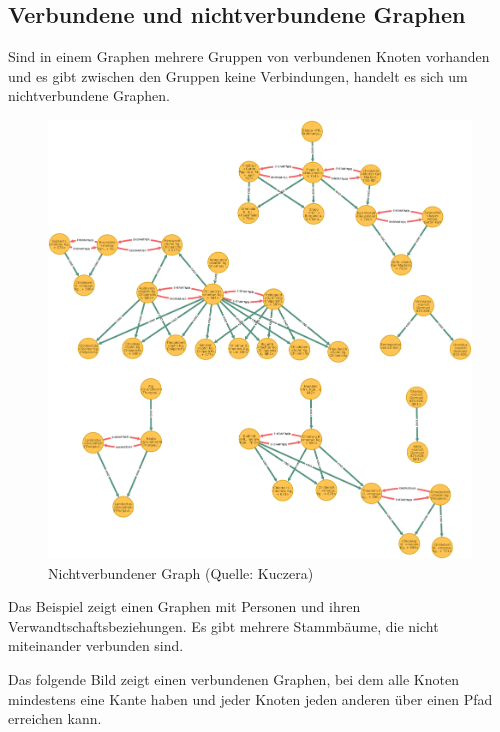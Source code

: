 \documentclass[ngerman,]{scrreprt}
\begin{document}
\hypertarget{verbundene-und-nichtverbundene-graphen}{%
\subsection{Verbundene und nichtverbundene Graphen}\label{verbundene-und-nichtverbundene-graphen}}

Sind in einem Graphen mehrere Gruppen von verbundenen Knoten vorhanden und es gibt zwischen den Gruppen keine Verbindungen, handelt es sich um nichtverbundene Graphen.

\begin{figure}
\centering
\includegraphics{Bilder/disconnectedGraph.png}
\caption{Nichtverbundener Graph (Quelle: Kuczera)}
\end{figure}

Das Beispiel zeigt einen Graphen mit Personen und ihren Verwandtschaftsbeziehungen. Es gibt mehrere Stammbäume, die nicht miteinander verbunden sind.

Das folgende Bild zeigt einen verbundenen Graphen, bei dem alle Knoten mindestens eine Kante haben und jeder Knoten jeden anderen über einen Pfad erreichen kann.
\end{document}
